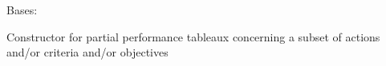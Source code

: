 \documentclass[letterpaper,10pt,english]{sphinxmanual}
\begin{document}

\begin{fulllineitems}
\label{techDoc:perfTabs.PartialPerformanceTableau}
Bases: {\hyperref[techDoc:perfTabs.PerformanceTableau]{\emph{}}}

Constructor for partial performance tableaux concerning a subset of actions and/or criteria and/or objectives

\end{fulllineitems}

\end{document}

